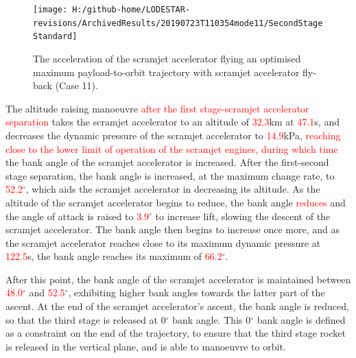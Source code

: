   \begin{figure}[!ht] %
  	\centering
  	\texttt{[image: H:/github-home/LODESTAR-revisions/ArchivedResults/20190723T110354mode11/SecondStageStandard]}
  	\caption{The acceleration of the scramjet accelerator flying an optimised maximum payload-to-orbit trajectory with scramjet accelerator fly-back (Case 11). }
  	\label{fig:SecondStageStandard}
  \end{figure}
The altitude raising manoeuvre \textcolor{red}{after the first stage-scramjet accelerator separation} takes the scramjet accelerator to an altitude of \textcolor{red}{32.3}km at \textcolor{red}{47.1}s, and decreases the dynamic pressure of the scramjet accelerator to \textcolor{red}{14.9}kPa, \textcolor{red}{reaching close to the lower limit of operation of the scramjet engines,} \textcolor{red}{during which time} the bank angle of the scramjet accelerator is increased. 
 After the first-second stage separation, the bank angle is increased, at the maximum change rate, to \textcolor{red}{52.2}$^\circ$, which aids the scramjet accelerator in decreasing its altitude. As the altitude of the scramjet accelerator begins to reduce, the bank angle \textcolor{red}{reduces} and the angle of attack is raised to \textcolor{red}{3.9}$^\circ$ to increase lift, slowing the descent of the scramjet accelerator. 
 The bank angle then begins to increase once more, and as the scramjet accelerator reaches close to its maximum dynamic pressure at \textcolor{red}{122.5}s, the bank angle reaches its maximum of \textcolor{red}{66.2}$^\circ$. 

After this point, the bank angle of the scramjet accelerator is maintained between \textcolor{red}{48.0}$^\circ$ and \textcolor{red}{52.5}$^\circ$, exhibiting higher bank angles towards the latter part of the ascent. At the end of the scramjet accelerator's ascent, the bank angle is reduced, so that the third stage is released at 0$^\circ$ bank angle. This 0$^\circ$ bank angle is defined as a constraint on the end of the trajectory, to ensure that the third stage rocket is released in the vertical plane, and is able to manoeuvre to orbit. 


